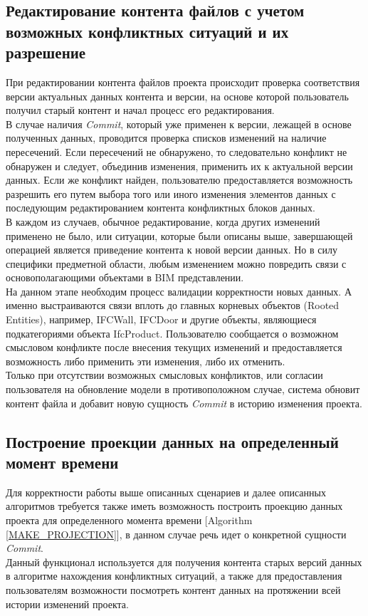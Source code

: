 \documentclass[a4paper,14pt]{extreport} %
\begin{document}
\subsection{Редактирование контента файлов с учетом возможных конфликтных ситуаций и их разрешение}

При редактировании контента файлов проекта происходит проверка соответствия версии актуальных данных контента и версии, на основе которой пользователь получил старый контент и начал процесс его редактирования.  \\
В случае наличия \textit{Commit}, который уже применен к версии, лежащей в основе полученных данных, проводится проверка списков изменений на наличие пересечений. Если пересечений не обнаружено, то следовательно конфликт не обнаружен и следует, объединив изменения, применить их к актуальной версии данных. Если же конфликт найден, пользователю предоставляется возможность разрешить его путем выбора того или иного изменения элементов данных с последующим редактированием контента конфликтных блоков данных. \\
В каждом из случаев, обычное редактирование, когда других изменений применено не было, или ситуации, которые были описаны выше, завершающей операцией является приведение контента к новой версии данных. Но в силу специфики предметной области, любым изменением можно повредить связи с основополагающими объектами в BIM представлении. \\
На данном этапе необходим процесс валидации корректности новых данных. А именно выстраиваются связи вплоть до главных корневых объектов (Rooted Entities), например, IFCWall, IFCDoor и другие объекты, являющиеся подкатегориями объекта IfcProduct. Пользователю сообщается о возможном смысловом конфликте после внесения текущих изменений и предоставляется возможность либо применить эти изменения, либо их отменить. \\
Только при отсутствии возможных смысловых конфликтов, или согласии пользователя на обновление модели в противоположном случае, система обновит контент файла и добавит новую сущность \textit{Commit} в историю изменения проекта.

\subsection{Построение проекции данных на определенный момент времени}

Для корректности работы выше описанных сценариев и далее описанных алгоритмов требуется также иметь возможность построить проекцию данных проекта для определенного момента времени [Algorithm \ref{MAKE_PROJECTION}], в данном случае речь идет о конкретной сущности \textit{Commit}. \\
Данный функционал используется для получения контента старых версий данных в алгоритме нахождения конфликтных ситуаций, а также для предоставления пользователям возможности посмотреть контент данных на протяжении всей истории изменений проекта.
\end{document}
